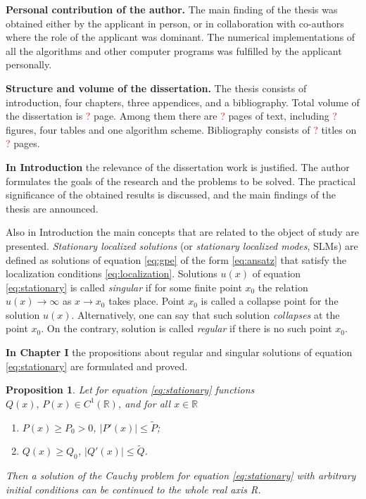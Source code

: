\documentclass[candidate, href, colorlinks]{disser}
\newtheorem{proposition}{Proposition}
\begin{document}
\textbf{Personal contribution of the author.}
The main finding of the thesis was obtained either by the applicant in person, or in collaboration with co-authors where the role of the applicant was dominant.
The numerical implementations of all the algorithms and other computer programs was fulfilled by the applicant personally.

\textbf{Structure and volume of the dissertation.}
The thesis consists of introduction, four chapters, three appendices, and a bibliography.
Total volume of the dissertation is \textcolor{red}{?} page.
Among them there are \textcolor{red}{?} pages of text, including \textcolor{red}{?} figures, four tables and one algorithm scheme.
Bibliography consists of \textcolor{red}{?} titles on \textcolor{red}{?} pages.


\textbf{In Introduction} the relevance of the dissertation work is justified.
The author formulates the goals of the research and the problems to be solved.
The practical significance of the obtained results is discussed, and the main findings of the thesis are announced.

Also in Introduction the main concepts that are related to the object of study are presented.
{\it Stationary localized solutions} (or {\it stationary localized modes}, SLMs) are defined as solutions of equation \eqref{eq:gpe} of the form \eqref{eq:ansatz} that satisfy the localization conditions \eqref{eq:localization}.
Solutions $u(x)$ of equation \eqref{eq:stationary} is called  {\it singular} if for some finite point $x_0$ the relation $u(x) \to \infty$ as $x \to x_0$ takes place.
Point $x_0$ is called a collapse point for the solution $u(x)$.
Alternatively, one can say that such solution {\it collapses} at the point $x_0$.
On the contrary, solution is called {\it regular} if there is no such point $x_0$.

\textbf{In Chapter I} the propositions about regular and singular solutions of equation \eqref{eq:stationary} are formulated and proved.

\begin{proposition}
\label{prop:absense-of-singular-solutions}
	Let for equation \eqref{eq:stationary} functions $Q(x), \, P(x) \in C^1(\mathbb{R})$, and for all $x \in \mathbb{R}$
	\begin{enumerate}
		\item[(a)] $P(x) \ge P_0 > 0$, $|P'(x)| \le \widetilde{P}$;
		\item[(b)] $Q(x) \ge Q_0$, $|Q'(x)| \le \widetilde{Q}$.
	\end{enumerate}
	Then a solution of the Cauchy problem for equation \eqref{eq:stationary} with arbitrary initial condi­tions can be continued to the whole real axis R.
\end{proposition}
\end{document}

